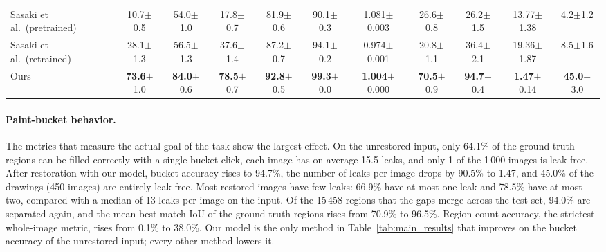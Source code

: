 \documentclass[11pt]{article}
\begin{document}
\begin{table}[t]
{\begin{tabular}{lcccccccccc}
Sasaki et al.\ (pretrained) & 10.7{\scriptsize$\pm$0.5} & 54.0{\scriptsize$\pm$1.0} & 17.8{\scriptsize$\pm$0.7} & 81.9{\scriptsize$\pm$0.6} & 90.1{\scriptsize$\pm$0.3} & 1.081{\scriptsize$\pm$0.003} & 26.6{\scriptsize$\pm$0.8} & 26.2{\scriptsize$\pm$1.5} & 13.77{\scriptsize$\pm$1.38} & 4.2{\scriptsize$\pm$1.2} \\
Sasaki et al.\ (retrained) & 28.1{\scriptsize$\pm$1.3} & 56.5{\scriptsize$\pm$1.3} & 37.6{\scriptsize$\pm$1.4} & 87.2{\scriptsize$\pm$0.7} & 94.1{\scriptsize$\pm$0.2} & 0.974{\scriptsize$\pm$0.001} & 20.8{\scriptsize$\pm$1.1} & 36.4{\scriptsize$\pm$2.1} & 19.36{\scriptsize$\pm$1.87} & 8.5{\scriptsize$\pm$1.6} \\
Ours & \textbf{73.6}{\scriptsize$\pm$1.0} & \textbf{84.0}{\scriptsize$\pm$0.6} & \textbf{78.5}{\scriptsize$\pm$0.7} & \textbf{92.8}{\scriptsize$\pm$0.5} & \textbf{99.3}{\scriptsize$\pm$0.0} & \textbf{1.004}{\scriptsize$\pm$0.000} & \textbf{70.5}{\scriptsize$\pm$0.9} & \textbf{94.7}{\scriptsize$\pm$0.4} & \textbf{1.47}{\scriptsize$\pm$0.14} & \textbf{45.0}{\scriptsize$\pm$3.0} \\
\bottomrule
\end{tabular}}
\end{table}

\paragraph{Paint-bucket behavior.} The metrics that measure the actual goal of the
task show the largest effect. On the unrestored input, only 64.1\% of the
ground-truth regions can be filled correctly with a single bucket click, each image
has on average 15.5 leaks, and only 1 of the 1\,000 images is leak-free. After
restoration with our model, bucket accuracy rises to 94.7\%, the number of leaks per
image drops by 90.5\% to 1.47, and 45.0\% of the drawings (450 images) are entirely
leak-free. Most restored images have few leaks: 66.9\% have at most one leak and
78.5\% have at most two, compared with a median of 13 leaks per image on the input.
Of the 15\,458 regions that the gaps merge across the test set, 94.0\% are separated
again, and the mean best-match IoU of the ground-truth regions rises from 70.9\% to
96.5\%. Region count accuracy, the strictest whole-image metric, rises from 0.1\% to
38.0\%. Our model is the only method in Table~\ref{tab:main_results} that improves
on the bucket accuracy of the unrestored input; every other method lowers it.
\end{document}
